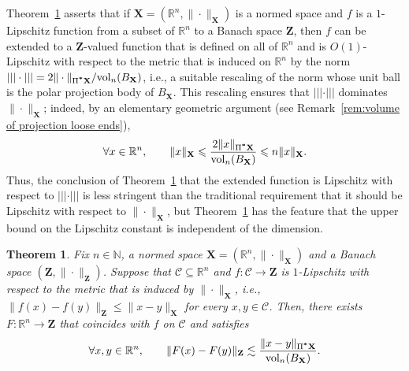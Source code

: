 \documentclass[11pt,reqno]{amsart}
\renewcommand{\le}{\leqslant}
\newcommand{\X}{\mathbf X}
\newcommand{\R}{\mathbb R}
\newtheorem{theorem}{Theorem}
\theoremstyle{remark}
\renewcommand{\subset}{\subseteq}
\newcommand{\N}{\mathbb N}
\newcommand{\bfZ}{\mathbf{Z}}
\newcommand{\sub}{\mathscr{C}}
\newcommand{\vol}{\mathrm{vol}}
\renewcommand{\1}{\mathbf 1}
\begin{document}
Theorem~\ref{thm:nonstandard ext}  asserts that if $\X=(\R^n,\|\cdot\|_\X)$ is a normed space and $f$ is a $1$-Lipschitz function from a subset of $\R^n$ to a Banach space $\bfZ$, then $f$ can be extended to a $\bfZ$-valued function that is defined on all of $\R^n$ and is $O(1)$-Lipschitz with respect to the metric that is induced on $\R^n$ by the norm $|||\cdot|||=2\|\cdot\|_{\Pi^{\textbf *}\X}/\vol_n(B_\X)$, i.e., a suitable rescaling of the norm whose unit ball is the polar projection body of $B_\X$. This rescaling  ensures that $|||\cdot|||$ dominates $\|\cdot\|_\X$;  indeed, by an elementary geometric argument (see Remark~\ref{rem:volume of projection loose ends}),
\begin{equation}\label{eq:polar projection body bounds}
\forall x\in \R^n,\qquad \|x\|_\X\le \frac{2\|x\|_{\Pi^{\textbf *}\X}}{\vol_n(B_\X)}\le n\|x\|_\X.
\end{equation}
Thus, the conclusion of Theorem~\ref{thm:nonstandard ext} that the extended function is Lipschitz with respect to $|||\cdot|||$ is less stringent than the traditional requirement that it should be Lipschitz with respect to $\|\cdot\|_\X$, but Theorem~\ref{thm:nonstandard ext} has the feature that the upper bound on the Lipschitz constant is independent of the dimension.






\begin{theorem}\label{thm:nonstandard ext} Fix $n\in \N$, a normed space $\X=(\R^n,\|\cdot\|_\X)$ and a Banach space $(\bfZ,\|\cdot\|_{\bfZ})$. Suppose that $\sub\subset \R^n$  and $f:\sub\to \bfZ$ is $1$-Lipschitz with respect to the metric that is induced by $\|\cdot\|_\X$, i.e., $\|f(x)-f(y)\|_\bfZ\le \|x-y\|_\X$ for every $x,y\in \sub$.  Then, there exists $F:\R^n\to \bfZ$ that coincides with $f$ on $\sub$ and satisfies
$$
\forall x,y\in \R^n,\qquad \|F(x)-F(y)\|_\bfZ\lesssim \frac{\|x-y\|_{\Pi^{\textbf *}\X}}{\vol_n(B_\X)}.
$$
\end{theorem}
\end{document}
